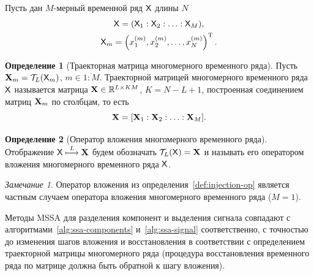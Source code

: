\documentclass[specialist,
  substylefile=spbu_report.rtx,
subf,href,colorlinks=true, 12pt]{disser}
\theoremstyle{plain}
\theoremstyle{definition}
\newtheorem{definition}{Определение}[section]
\theoremstyle{remark}
\newtheorem{remark}{Замечание}[section]
\begin{document}
Пусть дан $M$-мерный временной ряд $\mathsf{X}$ длины $N$
\begin{gather*}
  \mathsf{X} = (\mathsf{X}_1: \mathsf{X}_2: \ldots: \mathsf{X}_M), \\
  \mathsf{X}_m = \left(x_1^{(m)}, x_2^{(m)}, \ldots, x_N^{(m)}\right)^{\mathrm{T}}.
\end{gather*}

\begin{definition}[Траекторная матрица многомерного временного ряда]
  Пусть \linebreak $\mathbf{X}_m = \mathcal{T}_L(\mathsf{X}_m)$, $m \in \overline{1:M}$.
  Траекторной матрицей многомерного временного ряда $\mathsf{X}$ называется
  матрица $\mathbf{X}\in \mathbb{R}^{L \times KM}$, $K = N - L + 1$, построенная
  соединением матриц $\mathbf{X}_m$ по столбцам, то есть
  \[
    \mathbf{X} = [\mathbf{X}_1 : \mathbf{X}_2 : \ldots : \mathbf{X}_M].
  \]
\end{definition}

\begin{definition}[Оператор вложения многомерного временного ряда]
  Отображение $\mathsf{X} \stackrel{L}{\longmapsto} \mathbf{X}$ будем обозначать
  $\mathcal{T}_L(\mathsf{X}) = \mathbf{X}$ и называть его оператором вложения многомерного
  временного ряда $\mathsf{X}$.
\end{definition}

\begin{remark}
  Оператор вложения из определения~\ref{def:injection-op} является
  частным случаем оператора вложения многомерного временного ряда
  ($M=1$).
\end{remark}

Методы MSSA для разделения компонент и выделения сигнала совпадают с
алгоритмами~\ref{alg:ssa-components}
и~\ref{alg:ssa-signal} соответственно, с точностью до изменения шагов
вложения и восстановления в соответствии
с определением траекторной матрицы многомерного ряда (процедура
  восстановления временного ряда по
матрице должна быть обратной к шагу вложения).
\end{document}
